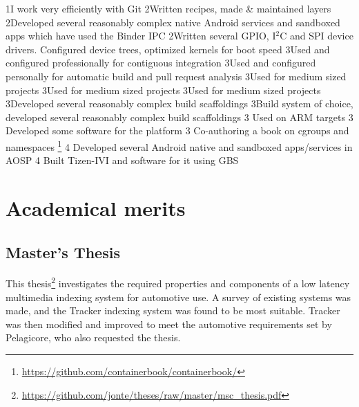 \documentclass{twocolcv}
\begin{document}
 {
                {1}{I work very efficiently with Git}
              {2}{Written recipes, made \& maintained layers}
     {2}{Developed several reasonably complex native Android services and sandboxed apps which have used the Binder IPC}
       {2}{Written several GPIO, I$^2$C and SPI device drivers. Configured device trees, optimized kernels for boot speed}
            {3}{Used and configured professionally for contiguous integration }
          {3}{Used and configured personally for automatic build and pull request analysis }
            {3}{Used for medium sized projects}
               {3}{Used for medium sized projects}
             {3}{Used for medium sized projects}
           {3}{Developed several reasonably complex build scaffoldings}
              {3}{Build system of choice, developed several reasonably complex build scaffoldings}
             {3} {Used on ARM targets}
          {3} {Developed some software for the platform}
        {3} {Co-authoring a book on cgroups and namespaces \footnote{\url{https://github.com/containerbook/containerbook/}}}
       {4} {Developed several Android native and sandboxed apps/services in AOSP}
     {4} {Built Tizen-IVI and software for it using GBS}
}

\section*{Academical merits}

  \subsection*{Master's Thesis}
This thesis\footnote{\url{https://github.com/jonte/theses/raw/master/msc_thesis.pdf}} investigates the required properties and components of a low latency multimedia indexing system for automotive use. A survey of existing systems was made, and the Tracker indexing system was found to be most suitable. Tracker was then modified and improved to meet the automotive requirements set by Pelagicore, who also requested the thesis.
\end{document}
